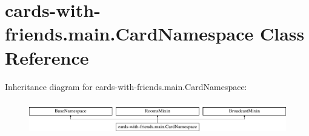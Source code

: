 \hypertarget{classcards-with-friends_1_1main_1_1_card_namespace}{\section{cards-\/with-\/friends.main.\-Card\-Namespace Class Reference}
\label{classcards-with-friends_1_1main_1_1_card_namespace}
}
Inheritance diagram for cards-\/with-\/friends.main.\-Card\-Namespace\-:\begin{figure}[H]
\begin{center}
\leavevmode
\includegraphics[height=1.464052cm]{classcards-with-friends_1_1main_1_1_card_namespace}
\end{center}
\end{figure}
